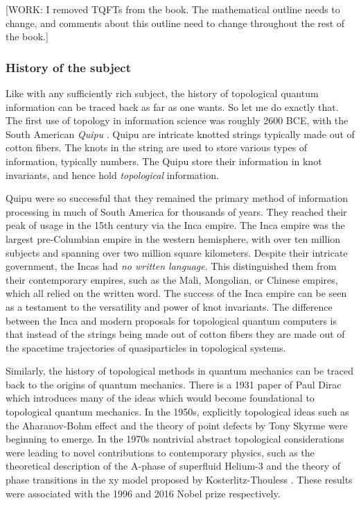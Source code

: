 \documentclass{article}
\theoremstyle{definition}
\numberwithin{figure}{section}
\begin{document}
[WORK: I removed TQFTs from the book. The mathematical outline needs to change, and comments about this outline need to change throughout the rest of the book.]

\subsubsection{History of the subject}

Like with any sufficiently rich subject, the history of topological quantum information can be traced back as far as one wants. So let me do exactly that. The first use of topology in information science was roughly 2600 BCE, with the South American \textit{Quipu} \cite{ascher1981code}. Quipu are intricate knotted strings typically made out of cotton fibers. The knots in the string are used to store various types of information, typically numbers. The Quipu store their information in knot invariants, and hence hold \textit{topological} information.

Quipu were so successful that they remained the primary method of information processing in much of South America for thousands of years. They reached their peak of usage in the 15th century via the Inca empire. The Inca empire was the largest pre-Columbian empire in the western hemisphere, with over ten million subjects and spanning over two million square kilometers. Despite their intricate government, the Incas had \textit{no written language}. This distinguished them from their contemporary empires, such as the Mali, Mongolian, or Chinese empires, which all relied on the written word. The success of the Inca empire can be seen as a testament to the versatility and power of knot invariants. The difference between the Inca and modern proposals for topological quantum computers is that instead of the strings being made out of cotton fibers they are made out of the spacetime trajectories of quasiparticles in topological systems.

Similarly, the history of topological methods in quantum mechanics can be traced back to the origins of quantum mechanics. There is a 1931 paper of Paul Dirac \cite{dirac1931quantised} which introduces many of the ideas which would become foundational to topological quantum mechanics. In the 1950s, explicitly topological ideas such as the Aharanov-Bohm effect \cite{aharonov1959significance} and the theory of point defects by Tony Skyrme \cite{skyrme1962unified} were beginning to emerge. In the 1970s nontrivial abstract topological considerations were leading to novel contributions to contemporary physics, such as the theoretical description of the A-phase of superfluid Helium-3 \cite{anderson1977phase} and the theory of phase transitions in the xy model proposed by Kosterlitz-Thouless \cite{kosterlitz1973ordering}. These results were associated with the 1996 and 2016 Nobel prize respectively.
\end{document}
